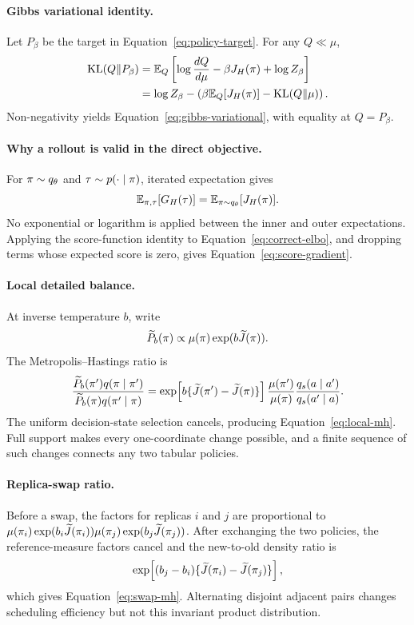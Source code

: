 \label{app:derivations}

\paragraph{Gibbs variational identity.}
Let \(P_\beta\) be the target in Equation~\eqref{eq:policy-target}. For any
\(Q\ll\mu\),
\begin{align}
  \operatorname{KL}(Q\|P_\beta)
  &= \mathbb{E}_Q\left[
       \log\frac{dQ}{d\mu}
       - \beta J_H(\pi)
       + \log Z_\beta
     \right] \\
  &= \log Z_\beta
     - \left(
       \beta\mathbb{E}_Q[J_H(\pi)]
       - \operatorname{KL}(Q\|\mu)
     \right).
\end{align}
Non-negativity yields Equation~\eqref{eq:gibbs-variational}, with equality at
\(Q=P_\beta\).

\paragraph{Why a rollout is valid in the direct objective.}
For \(\pi\sim q_\theta\) and
\(\tau\sim p(\cdot\mid\pi)\), iterated expectation gives
\[
  \mathbb{E}_{\pi,\tau}[G_H(\tau)]
  = \mathbb{E}_{\pi\sim q_\theta}
    [J_H(\pi)].
\]
No exponential or logarithm is applied between the inner and outer
expectations.  Applying the score-function identity to
Equation~\eqref{eq:correct-elbo}, and dropping terms whose expected score is
zero, gives Equation~\eqref{eq:score-gradient}.

\paragraph{Local detailed balance.}
At inverse temperature \(b\), write
\[
  \widetilde P_b(\pi)\propto
  \mu(\pi)\exp(b\widetilde J(\pi)).
\]
The Metropolis--Hastings ratio is
\[
  \frac{\widetilde P_b(\pi')q(\pi\mid\pi')}
       {\widetilde P_b(\pi)q(\pi'\mid\pi)}
  =
  \exp\!\left[b\{\widetilde J(\pi')-
                   \widetilde J(\pi)\}\right]
  \frac{\mu(\pi')}{\mu(\pi)}
  \frac{q_s(a\mid a')}{q_s(a'\mid a)}.
\]
The uniform decision-state selection cancels, producing
Equation~\eqref{eq:local-mh}.  Full support makes every one-coordinate change
possible, and a finite sequence of such changes connects any two tabular
policies.

\paragraph{Replica-swap ratio.}
Before a swap, the factors for replicas \(i\) and \(j\) are proportional to
\(
  \mu(\pi_i)\exp(b_i\widetilde J(\pi_i))
  \mu(\pi_j)\exp(b_j\widetilde J(\pi_j))
\).
After exchanging the two policies, the reference-measure factors cancel and
the new-to-old density ratio is
\[
  \exp\!\left[(b_j-b_i)
    \{\widetilde J(\pi_i)-\widetilde J(\pi_j)\}\right],
\]
which gives Equation~\eqref{eq:swap-mh}.  Alternating disjoint adjacent pairs
changes scheduling efficiency but not this invariant product distribution.

